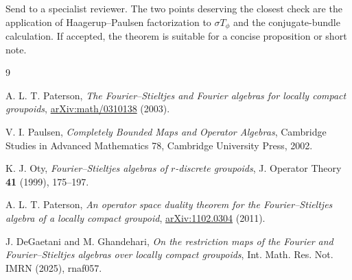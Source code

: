 \documentclass[11pt]{article}
\theoremstyle{remark}
\begin{document}
Send to a specialist reviewer.  The two points deserving the closest check
are the application of Haagerup--Paulsen factorization to
\(\sigma T_\phi\) and the conjugate-bundle calculation.  If accepted, the
theorem is suitable for a concise proposition or short note.

\begin{thebibliography}{9}

A. L. T. Paterson,
\emph{The Fourier--Stieltjes and Fourier algebras for locally compact
groupoids},
\href{https://arxiv.org/abs/math/0310138}{arXiv:math/0310138} (2003).

V. I. Paulsen,
\emph{Completely Bounded Maps and Operator Algebras},
Cambridge Studies in Advanced Mathematics 78,
Cambridge University Press, 2002.

K. J. Oty,
\emph{Fourier--Stieltjes algebras of \(r\)-discrete groupoids},
J. Operator Theory \textbf{41} (1999), 175--197.

A. L. T. Paterson,
\emph{An operator space duality theorem for the Fourier--Stieltjes algebra of
a locally compact groupoid},
\href{https://arxiv.org/abs/1102.0304}{arXiv:1102.0304} (2011).

J. DeGaetani and M. Ghandehari,
\emph{On the restriction maps of the Fourier and Fourier--Stieltjes algebras
over locally compact groupoids},
Int. Math. Res. Not. IMRN (2025), rnaf057.

\end{thebibliography}
\end{document}

